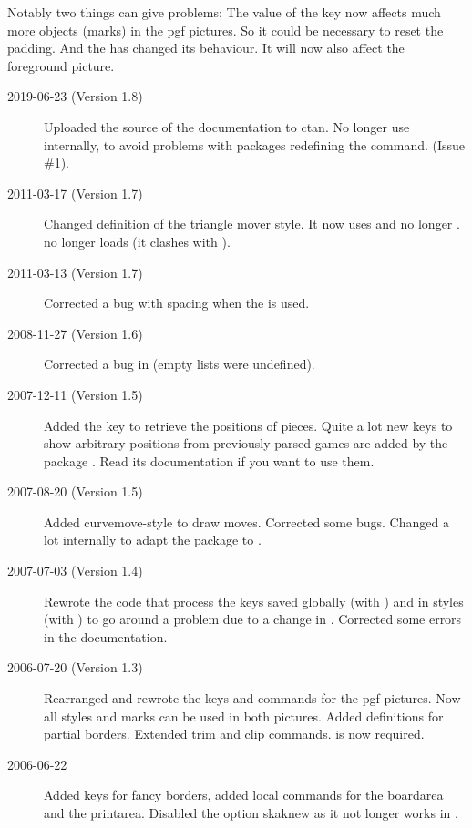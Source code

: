 \documentclass[pagesize,parskip=half-,fontsize=12pt]{scrartcl}
\begin{document}
Notably two things can give problems: The value of the
 key now affects much more objects (marks) in the pgf
pictures. So it could be necessary to reset the padding. And the
 has changed its behaviour. It will now also affect
the foreground picture.

\begin{description}
\item[2019-06-23 (Version 1.8)] Uploaded the source of the documentation to ctan.
  No longer use  internally, to avoid problems with packages redefining the command. (Issue \#1).

\item[2011-03-17 (Version 1.7)] Changed definition of the triangle mover
    style. It now uses  and no longer
    .  no longer loads
     (it clashes with ).

\item[2011-03-13 (Version 1.7)] Corrected a bug with spacing when the
     is used.


\item[2008-11-27 (Version 1.6)] Corrected a bug in 
(empty lists were undefined).


\item[2007-12-11 (Version 1.5)] Added the key  to
retrieve the positions of pieces. Quite a lot new keys to show
arbitrary positions from previously parsed games are added by the
package . Read its documentation if you want to
use them.

\item[2007-08-20 (Version 1.5)] Added curvemove-style to draw moves.
Corrected some bugs. Changed a lot internally to adapt the package to
.

\item[2007-07-03 (Version 1.4)] Rewrote the code that process the
keys saved globally (with ) and  in styles (with
) to go around a problem due to a change in
. Corrected some errors in the
documentation.
\item[2006-07-20 (Version 1.3)] Rearranged and rewrote the keys and commands for
the pgf-pictures. Now all styles and marks can be used in both
pictures. Added definitions for partial borders. Extended trim and
clip commands.  is now required.
\item[2006-06-22] Added keys for fancy borders, added local commands for
the boardarea and the printarea. Disabled the option skaknew as it
not longer works in \chessfss.
\end{description}
\end{document}
